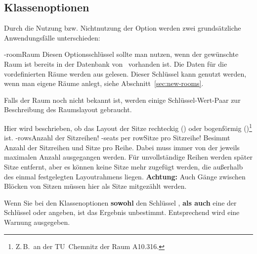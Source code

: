 \documentclass[
babel-options={ngerman},
load-preamble-,
scrartcl={headings=small}
]{cnltx-doc}
\providecommand{\packagename}{tucseating}
\def\thepkg{\pkg*{\packagename}}
\begin{document}
\subsection{Klassenoptionen}
\label{sec:class-options}
Durch die Nutzung bzw. Nichtnutzung der Option  werden zwei
grundsätzliche Anwendungsfälle unterschieden:
\begin{options}
  \keyval-{room}{Raum}\Default{}
  Diesen Optionsschlüssel sollte man nutzen, wenn der gewünschte
  Raum ist bereits in der Datenbank von \thepkg\ vorhanden ist.
  Die Daten für die vordefinierten Räune werden
  aus  gelesen. 
  Dieser Schlüssel kann genutzt werden, wenn man eigene Räume anlegt, siehe
  Abschnitt~\ref{sec:new-rooms}.
\end{options}
Falls der Raum noch nicht bekannt ist, werden einige Schlüssel-Wert-Paar zur
Beschreibung des Raumslayout gebraucht.
\begin{options}
  Hier wird beschrieben, ob das Layout der Sitze rechteckig
  () oder bogenförmig ()\footnote{Z.\,B.\ an der
    TU~Chemnitz der Raum A10.316.} ist.
  \keyval-{rows}{Anzahl der Sitzreihen}\Default*!{}\vspace{-.3\baselineskip}
  \keyval-{seats per row}{Sitze pro Sitzreihe}\Default!{}
  Besimmt Anzahl der Sitzreihen und Sitze pro Reihe. Dabei muss immer von der
  jeweils maximalen Anzahl ausgegangen werden. Für unvollständige Reihen werden später Sitze
  entfernt, aber es können keine Sitze mehr zugefügt werden, die außerhalb des einmal
  festgelegten Layoutrahmens liegen. \textbf{Achtung:} Auch Gänge zwischen
  Blöcken von Sitzen müssen hier als Sitze mitgezählt werden.
\end{options}
Wenn Sie bei den Klassenoptionen \textbf{sowohl} den Schlüssel , \textbf{als auch}
eine der Schlüssel  oder  angeben, ist das Ergebnis
unbestimmt. Entsprechend wird eine Warnung ausgegeben.\medskip
\end{document}
